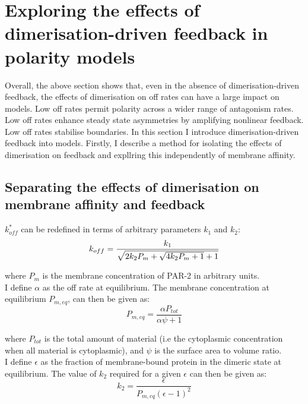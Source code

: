 \documentclass[12pt]{"report"}
\begin{document}
\clearpage
\section{Exploring the effects of dimerisation-driven feedback in polarity models}

Overall, the above section shows that, even in the absence of dimerisation-driven feedback, the effects of dimerisation on off rates can have a large impact on models. Low off rates permit polarity across a wider range of antagonism rates. Low off rates enhance steady state asymmetries by amplifying nonlinear feedback. Low off rates stabilise boundaries. In this section I introduce dimerisation-driven feedback into models. Firstly, I describe a method for isolating the effects of dimerisation on feedback and expllring this independently of membrane affinity.\\

\subsection{Separating the effects of dimerisation on membrane affinity and feedback}

$k_{off}^*$ can be redefined in terms of arbitrary parameters $k_1$ and $k_2$:
\begin{equation}
k_{off} = \frac{k_1}{\sqrt{2 k_2 P_m + \sqrt{4 k_2 P_m + 1} + 1}}\\
\end{equation}

where $P_m$ is the membrane concentration of PAR-2 in arbitrary units.\\

I define $\alpha$ as the off rate at equilibrium. The membrane concentration at equilibrium $P_{m, eq}$, can then be given as:
\begin{equation}
P_{m, eq} = \frac{\alpha P_{tot}}{\alpha \psi + 1}
\end{equation}

where $P_{tot}$ is the total amount of material (i.e the cytoplasmic concentration when all material is cytoplasmic), and $\psi$ is the surface area to volume ratio.\\

I define $\epsilon$ as the fraction of membrane-bound protein in the dimeric state at equilibrium. The value of $k_2$ required for a given $\epsilon$ can then be given as:
\begin{equation}
k_2 = \frac{\epsilon}{P_{m, eq} (\epsilon - 1)^2}
\end{equation}
\end{document}
